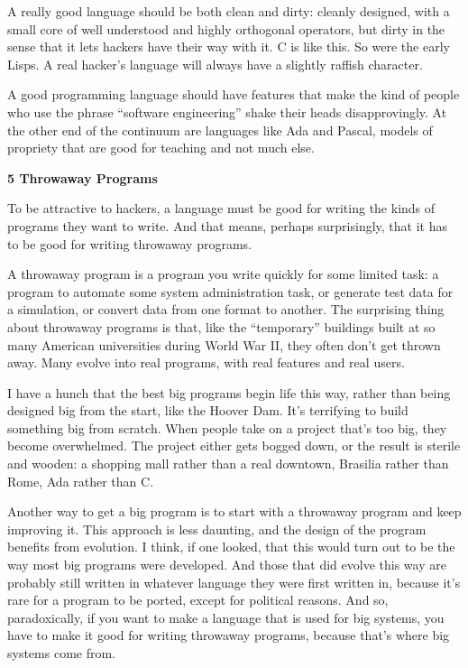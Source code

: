 A really good language should be both clean and dirty: cleanly designed,
with a small core of well understood and highly orthogonal operators,
but dirty in the sense that it lets hackers have their way with it. C is
like this. So were the early Lisps. A real hacker's language will always
have a slightly raffish character.

A good programming language should have features that make the kind of
people who use the phrase ``software engineering'' shake their heads
disapprovingly. At the other end of the continuum are languages like Ada
and Pascal, models of propriety that are good for teaching and not much
else.

\textbf{5 Throwaway Programs}

To be attractive to hackers, a language must be good for writing the
kinds of programs they want to write. And that means, perhaps
surprisingly, that it has to be good for writing throwaway programs.

A throwaway program is a program you write quickly for some limited
task: a program to automate some system administration task, or generate
test data for a simulation, or convert data from one format to another.
The surprising thing about throwaway programs is that, like the
``temporary'' buildings built at so many American universities during
World War II, they often don't get thrown away. Many evolve into real
programs, with real features and real users.

I have a hunch that the best big programs begin life this way, rather
than being designed big from the start, like the Hoover Dam. It's
terrifying to build something big from scratch. When people take on a
project that's too big, they become overwhelmed. The project either gets
bogged down, or the result is sterile and wooden: a shopping mall rather
than a real downtown, Brasilia rather than Rome, Ada rather than C.

Another way to get a big program is to start with a throwaway program
and keep improving it. This approach is less daunting, and the design of
the program benefits from evolution. I think, if one looked, that this
would turn out to be the way most big programs were developed. And those
that did evolve this way are probably still written in whatever language
they were first written in, because it's rare for a program to be
ported, except for political reasons. And so, paradoxically, if you want
to make a language that is used for big systems, you have to make it
good for writing throwaway programs, because that's where big systems
come from.

